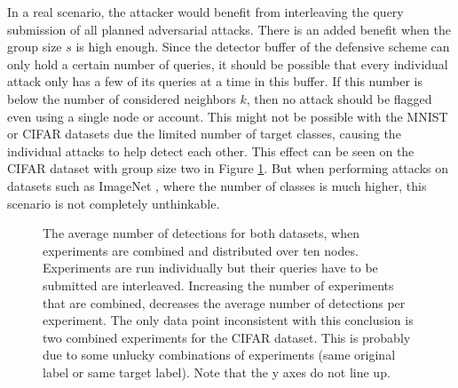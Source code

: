 In a real scenario, the attacker would benefit from interleaving the query submission of all planned adversarial attacks. There is an added benefit when the group size $s$ is high enough. Since the detector buffer of the defensive scheme can only hold a certain number of queries, it should be possible that every individual attack only has a few of its queries at a time in this buffer. If this number is below the number of considered neighbors $k$, then no attack should be flagged even using a single node or account. This might not be possible with the MNIST or CIFAR datasets due the limited number of target classes, causing the individual attacks to help detect each other. This effect can be seen on the CIFAR dataset with group size two in Figure \ref{fig:detections_combinations}. But when performing attacks on datasets such as ImageNet \cite{imagenet}, where the number of classes is much higher, this scenario is not completely unthinkable.\\

\begin{figure}
\centering
{}
%
\caption[Detections for combinations of experiments]{The average number of detections for both datasets, when experiments are combined and distributed over ten nodes. Experiments are run individually but their queries have to be submitted are interleaved. Increasing the number of experiments that are combined, decreases the average number of detections per experiment. The only data point inconsistent with this conclusion is two combined experiments for the CIFAR dataset. This is probably due to some unlucky combinations of experiments (same original label or same target label). Note that the y axes do not line up.}
\label{fig:detections_combinations}
\end{figure}

